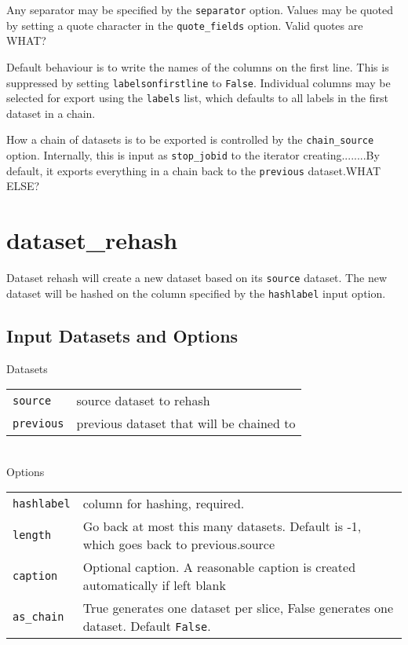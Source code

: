 Any separator may be specified by the \texttt{separator} option.
Values may be quoted by setting a quote character in the
\texttt{quote\_fields} option.  Valid quotes are WHAT?


Default behaviour is to write the names of the columns on the first
line.  This is suppressed by setting \texttt{labelsonfirstline} to
\texttt{False}.  Individual columns may be selected for export using
the \texttt{labels} list, which defaults to all labels in the first
dataset in a chain.

How a chain of datasets is to be exported is controlled by the
\texttt{chain\_source} option.  Internally, this is input as \texttt{stop\_jobid}
to the iterator creating........By default, it exports everything in a
chain back to the \texttt{previous} dataset.WHAT ELSE? 















\clearpage
\section{dataset\_rehash}

Dataset rehash will create a new dataset based on its \texttt{source}
dataset.  The new dataset will be hashed on the column specified by
the \texttt{hashlabel} input option.

\subsection{Input Datasets and Options}

Datasets\\

\begin{tabular}{ll}
  \texttt{source}   & source dataset to rehash\\
  \texttt{previous} & previous dataset that will be chained to\\
\end{tabular}\\


\noindent Options\\

\begin{tabular}{ll}
  \texttt{hashlabel} & column for hashing, required.\\
  \texttt{length}    & Go back at most this many datasets. Default is -1, which goes back to previous.source\\
  \texttt{caption}   & Optional caption.  A reasonable caption is created automatically if left blank\\
  \texttt{as\_chain}  & True generates one dataset per slice, False generates one dataset.  Default \texttt{False}.\\
\end{tabular}\\

